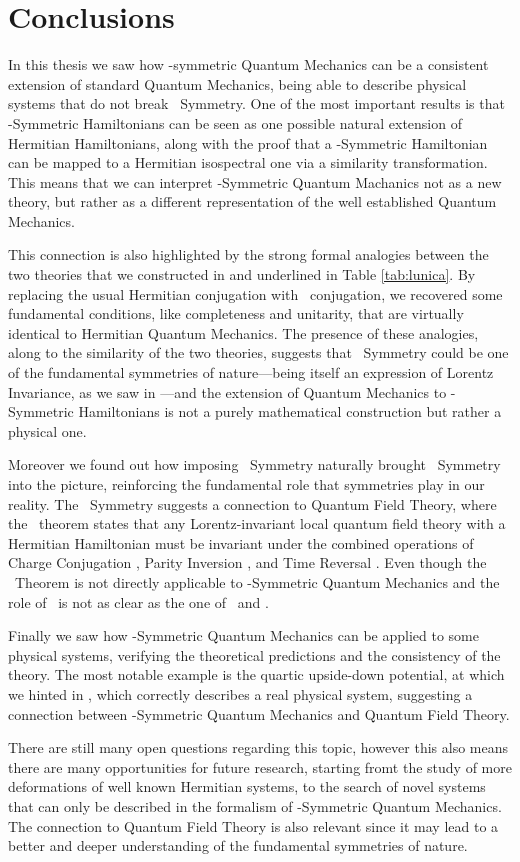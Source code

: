 \chapter{Conclusions}\label{ch:conclusions}
    In this thesis we saw how \PT-symmetric Quantum Mechanics can be a consistent extension of standard Quantum Mechanics, being able to describe physical systems that do not break \PT\ Symmetry. One of the most important results is that \PT-Symmetric Hamiltonians can be seen as one possible natural extension of Hermitian Hamiltonians, along with the proof that a \PT-Symmetric Hamiltonian can be mapped to a Hermitian isospectral one via a similarity transformation. This means that we can interpret \PT-Symmetric Quantum Machanics not as a new theory, but rather as a different representation of the well established Quantum Mechanics.
    
    This connection is also highlighted by the strong formal analogies between the two theories that we constructed in  and underlined in Table \ref{tab:lunica}. By replacing the usual Hermitian conjugation with \CPT\ conjugation, we recovered some fundamental conditions, like completeness and unitarity, that are virtually identical to Hermitian Quantum Mechanics. The presence of these analogies, along to the similarity of the two theories, suggests that \PT\ Symmetry could be one of the fundamental symmetries of nature---being itself an expression of Lorentz Invariance, as we saw in ---and the extension of Quantum Mechanics to \PT-Symmetric Hamiltonians is not a purely mathematical construction but rather a physical one.

    Moreover we found out how imposing \PT\ Symmetry naturally brought \CPT\ Symmetry into the picture, reinforcing the fundamental role that symmetries play in our reality. The \CPT\ Symmetry suggests a connection to Quantum Field Theory, where the \CPT\ theorem states that any Lorentz-invariant local quantum field theory with a Hermitian Hamiltonian must be invariant under the combined operations of Charge Conjugation \hC, Parity Inversion \hP, and Time Reversal \hT. Even though the \CPT\ Theorem is not directly applicable to \PT-Symmetric Quantum Mechanics and the role of \hC\ is not as clear as the one of \hP\ and \hT.

    Finally we saw how \PT-Symmetric Quantum Mechanics can be applied to some physical systems, verifying the theoretical predictions and the consistency of the theory. The most notable example is the quartic upside-down potential, at which we hinted in , which correctly describes a real physical system, suggesting a connection between \PT-Symmetric Quantum Mechanics and Quantum Field Theory.

    There are still many open questions regarding this topic, however this also means there are many opportunities for future research, starting fromt the study of more deformations of well known Hermitian systems, to the search of novel systems that can only be described in the formalism of \PT-Symmetric Quantum Mechanics. The connection to Quantum Field Theory is also relevant since it may lead to a better and deeper understanding of the fundamental symmetries of nature.